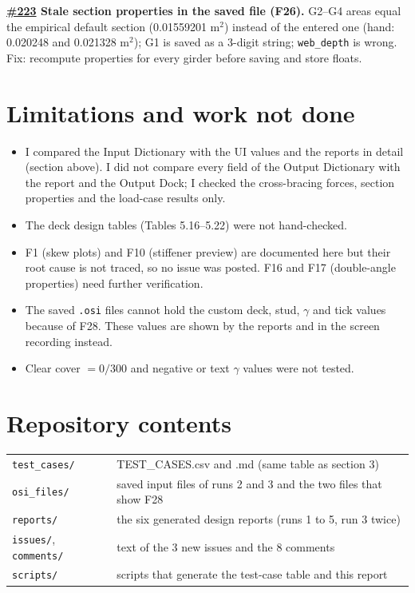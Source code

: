 \documentclass[10pt,a4paper]{article}
\begin{document}
\textbf{\href{https://github.com/Nidhikhare12/OsdagBridge/issues/223}{\#223} Stale section properties in the saved file (F26).} G2--G4 areas equal the empirical default section (0.01559201 m$^2$) instead of the entered one (hand: 0.020248 and 0.021328 m$^2$); G1 is saved as a 3-digit string; \texttt{web\_depth} is wrong. Fix: recompute properties for every girder before saving and store floats.

\section{Limitations and work not done}
\begin{itemize}[nosep]
\item I compared the Input Dictionary with the UI values and the reports in detail (section above). I did not compare every field of the Output Dictionary with the report and the Output Dock; I checked the cross-bracing forces, section properties and the load-case results only.
\item The deck design tables (Tables 5.16--5.22) were not hand-checked.
\item F1 (skew plots) and F10 (stiffener preview) are documented here but their root cause is not traced, so no issue was posted. F16 and F17 (double-angle properties) need further verification.
\item The saved \texttt{.osi} files cannot hold the custom deck, stud, $\gamma$ and tick values because of F28. These values are shown by the reports and in the screen recording instead.
\item Clear cover $=0/300$ and negative or text $\gamma$ values were not tested.
\end{itemize}

\section{Repository contents}
\begin{tabular}{ll}
\texttt{test\_cases/} & TEST\_CASES.csv and .md (same table as section 3) \\
\texttt{osi\_files/} & saved input files of runs 2 and 3 and the two files that show F28 \\
\texttt{reports/} & the six generated design reports (runs 1 to 5, run 3 twice) \\
\texttt{issues/}, \texttt{comments/} & text of the 3 new issues and the 8 comments \\
\texttt{scripts/} & scripts that generate the test-case table and this report \\
\end{tabular}
\end{document}
